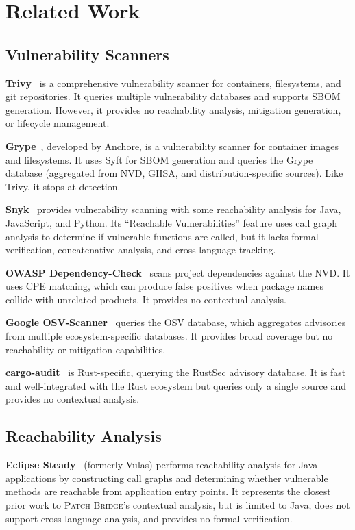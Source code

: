 \documentclass[11pt,twocolumn]{article}
\begin{document}
\section{Related Work}
\label{sec:related}

\subsection{Vulnerability Scanners}

\textbf{Trivy}~\cite{trivy} is a comprehensive vulnerability scanner
for containers, filesystems, and git repositories. It queries multiple
vulnerability databases and supports SBOM generation. However, it
provides no reachability analysis, mitigation generation, or lifecycle
management.

\textbf{Grype}~\cite{grype}, developed by Anchore, is a vulnerability
scanner for container images and filesystems. It uses Syft for SBOM
generation and queries the Grype database (aggregated from NVD, GHSA,
and distribution-specific sources). Like Trivy, it stops at detection.

\textbf{Snyk}~\cite{snyk} provides vulnerability scanning with some
reachability analysis for Java, JavaScript, and Python. Its
``Reachable Vulnerabilities'' feature uses call graph analysis to
determine if vulnerable functions are called, but it lacks formal
verification, concatenative analysis, and cross-language tracking.

\textbf{OWASP Dependency-Check}~\cite{owasp-depcheck} scans project
dependencies against the NVD. It uses CPE matching, which can produce
false positives when package names collide with unrelated products.
It provides no contextual analysis.

\textbf{Google OSV-Scanner}~\cite{osv-scanner} queries the OSV
database, which aggregates advisories from multiple ecosystem-specific
databases. It provides broad coverage but no reachability or
mitigation capabilities.

\textbf{cargo-audit}~\cite{cargo-audit} is Rust-specific, querying
the RustSec advisory database. It is fast and well-integrated with the
Rust ecosystem but queries only a single source and provides no
contextual analysis.

\subsection{Reachability Analysis}

\textbf{Eclipse Steady}~\cite{eclipse-steady} (formerly Vulas) performs
reachability analysis for Java applications by constructing call graphs
and determining whether vulnerable methods are reachable from
application entry points. It represents the closest prior work to
\textsc{Patch Bridge}'s contextual analysis, but is limited to Java,
does not support cross-language analysis, and provides no formal
verification.
\end{document}

